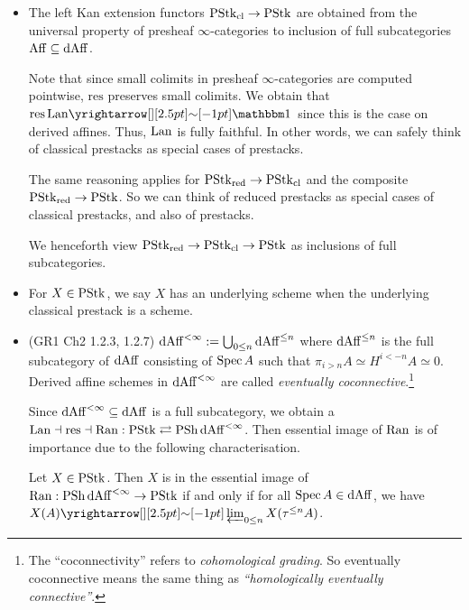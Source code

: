 \documentclass[./main.tex]{subfiles}
\begin{document}
\begin{itemize}

	\item {}
	
	The left Kan extension functors $\mathrm{PStk}_{\mathrm{cl}} \to \mathrm{PStk}$
  are obtained from the 
	{universal property of presheaf $\infty$-categories}
	to inclusion of full subcategories $\mathrm{Aff} \subseteq \mathrm{dAff}$.

	Note that since small colimits in presheaf $\infty$-categories are computed
	pointwise, $\mathrm{res}$ preserves small colimits.
	We obtain that $\mathrm{res}\,\LAN \map{\sim}{} \id{}$
	since this is the case on derived affines.
	Thus, $\mathrm{Lan}$ is fully faithful.
	In other words, we can safely think of classical prestacks
	as special cases of prestacks.

	The same reasoning applies for $\mathrm{PStk}_{\mathrm{red}} \to \mathrm{PStk}_{\mathrm{cl}}$
	and the composite $\mathrm{PStk}_{\mathrm{red}} \to \mathrm{PStk}$.
	So we can think of reduced prestacks as special cases of
	classical prestacks, and also of prestacks.

	We henceforth view $\mathrm{PStk}_{\mathrm{red}} \to \mathrm{PStk}_{\mathrm{cl}} \to \mathrm{PStk}$
	as inclusions of full subcategories.

	\item For $X \in \mathrm{PStk}$, we say $X$ has an underlying scheme when
	the underlying classical prestack is a scheme.

	\item (GR1 Ch2 1.2.3, 1.2.7)
	$\mathrm{dAff}^{<\infty} := \bigcup_{0 \leq n} \mathrm{dAff}^{\leq n}$ where
  $\mathrm{dAff}^{\leq n}$ is the full subcategory of $\mathrm{dAff}$ consisting of
	$\mathrm{Spec}\,A$ such that $\pi_{i > n} A \simeq H^{i < -n} A \simeq 0$.
	Derived affine schemes in $\mathrm{dAff}^{<\infty}$ are called
	\emph{eventually coconnective}.\footnote{
		The ``coconnectivity'' refers to \emph{cohomological grading}.
		So eventually coconnective means the same thing as
		\emph{``homologically eventually connective''}.
	}

	Since $\mathrm{dAff}^{<\infty} \subseteq \mathrm{dAff}$ is a full subcategory,
	we obtain a  
  $\mathrm{Lan} \dashv \mathrm{res} \dashv \mathrm{Ran} : 
	\mathrm{PStk} \rightleftarrows \mathrm{PSh}\,\mathrm{dAff}^{<\infty}$.
	Then essential image of $\mathrm{Ran}$ is of importance due to the following
	characterisation.
	\begin{prop}[GR1 Ch2 1.4.7]
		
		Let $X \in \mathrm{PStk}$.
		Then $X$ is in the essential image of 
		$\mathrm{Ran} : \mathrm{PSh}\,\mathrm{dAff}^{<\infty} \to \mathrm{PStk}$ if and only if
		for all $\mathrm{Spec}\,A \in \mathrm{dAff}$,
		we have $X(A) \map{\sim}{} \LIM_{0 \leq n} X(\tau^{\leq n} A)$.
	\end{prop}


\end{itemize}
\end{document}
